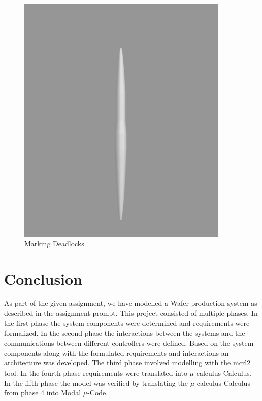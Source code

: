 \documentclass[a4paper,12pt]{article}
\begin{document}
\begin{figure}[ht]
\begin{minipage}{0.45\textwidth}
        \includegraphics[width=0.9\textwidth]{Deadlockfree.png} 
        \caption{Marking Deadlocks}
        \label{fig:deadlockfree}
    \end{minipage}
\end{figure}
\newpage
\section{Conclusion}
As part of the given assignment, we have modelled a Wafer production system as described in the assignment prompt. This project consisted of multiple phases. In the first phase the system components were determined and requirements were formalized. In the second phase the interactions between the systems and the communications between different controllers were defined. Based on the system components along with the formulated requirements and interactions an architecture was developed. The third phase involved modelling with the mcrl2 tool. In the fourth phase requirements were translated into $\mu$-calculus Calculus. In the fifth phase the model was verified by translating the $\mu$-calculus Calculus from phase 4 into Modal $\mu$-Code. 

\newpage
\appendix
\end{document}
